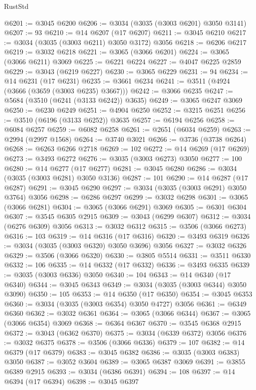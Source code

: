 \begin{lexlean}{RustStd}
\begin{coremodule}
@6201 := @3045 @6200
@6206 := @3034 (@3035 (@3003 @6201) @3050 @3141)
@6207 := 93
@6210 := @14 @6207 (@17 @6207)
@6211 := @3045 @6210
@6217 := @3034 (@3035 (@3003 @6211) @3050 @3172) @3056
@6218 := @6206 @6217
@6219 := @3032 @6218
@6221 := @3065 (@3066 @6201)
@6224 := @3065 (@3066 @6211) @3069
@6225 := @6221 @6224
@6227 := @4047 @6225 @2859
@6229 := @3043 (@6219 @6227)
@6230 := @3065 @6229
@6231 := 94
@6234 := @14 @6231 (@17 @6231)
@6235 := @3661 @6234
@6241 := @3511 (@4924 (@3666 (@3659 (@3003 @6235) @3667)))
@6242 := @3066 @6235
@6247 := @5684 (@3510 (@6241 (@3133 @6242)) @3635)
@6249 := @3065 @6247 @3069
@6250 := @6230 @6249
@6251 := @4904 @6250
@6252 := @3215 @6251
@6256 := @3510 (@6196 (@3133 @6252)) @3635
@6257 := @6194 @6256
@6258 := @6084 @6257
@6259 := @6082 @6258
@6261 := @2651 (@6034 @6259)
@6263 := @2994 (@2997 @1568)
@6264 := @3740 @3021
@6266 := @3736 (@3738 @6264)
@6268 := @6263 @6266 @2718
@6269 := 102
@6272 := @14 @6269 (@17 @6269)
@6273 := @3493 @6272
@6276 := @3035 (@3003 @6273) @3050
@6277 := 100
@6280 := @14 @6277 (@17 @6277)
@6281 := @3045 @6280
@6286 := @3034 (@3035 (@3003 @6281) @3050 @3136)
@6287 := 101
@6290 := @14 @6287 (@17 @6287)
@6291 := @3045 @6290
@6297 := @3034 (@3035 (@3003 @6291) @3050 @3764) @3056
@6298 := @6286 @6297
@6299 := @3032 @6298
@6301 := @3065 (@3066 @6281)
@6304 := @3065 (@3066 @6291) @3069
@6305 := @6301 @6304
@6307 := @3545 @6305 @2915
@6309 := @3043 (@6299 @6307)
@6312 := @3034 (@6276 @6309) @3056
@6313 := @3032 @6312
@6315 := @3506 (@3066 @6273)
@6316 := 103
@6319 := @14 @6316 (@17 @6316)
@6320 := @3493 @6319
@6326 := @3034 (@3035 (@3003 @6320) @3050 @3696) @3056
@6327 := @3032 @6326
@6329 := @3506 (@3066 @6320)
@6330 := @3805 @5514
@6331 := @3511 @6330
@6332 := 106
@6335 := @14 @6332 (@17 @6332)
@6336 := @3493 @6335
@6339 := @3035 (@3003 @6336) @3050
@6340 := 104
@6343 := @14 @6340 (@17 @6340)
@6344 := @3045 @6343
@6349 := @3034 (@3035 (@3003 @6344) @3050 @3090)
@6350 := 105
@6353 := @14 @6350 (@17 @6350)
@6354 := @3045 @6353
@6360 := @3034 (@3035 (@3003 @6354) @3050 @4727) @3056
@6361 := @6349 @6360
@6362 := @3032 @6361
@6364 := @3065 (@3066 @6344)
@6367 := @3065 (@3066 @6354) @3069
@6368 := @6364 @6367
@6370 := @3545 @6368 @2915
@6372 := @3043 (@6362 @6370)
@6375 := @3034 (@6339 @6372) @3056
@6376 := @3032 @6375
@6378 := @3506 (@3066 @6336)
@6379 := 107
@6382 := @14 @6379 (@17 @6379)
@6383 := @3045 @6382
@6386 := @3035 (@3003 @6383) @3050
@6387 := @3052 @3604
@6389 := @3065 @6387 @3069
@6391 := @3855 @6389 @2915
@6393 := @3034 (@6386 @6391)
@6394 := 108
@6397 := @14 @6394 (@17 @6394)
@6398 := @3045 @6397

\end{coremodule}
\end{lexlean}
